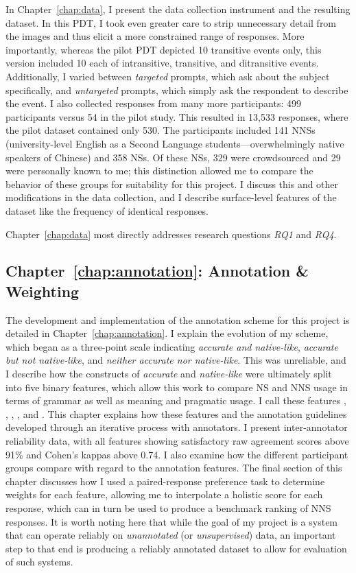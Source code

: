 In Chapter~\ref{chap:data}, I present the data collection instrument and the resulting dataset. In this PDT, I took even greater care to strip unnecessary detail from the images and thus elicit a more constrained range of responses. More importantly, whereas the pilot PDT depicted 10 transitive events only, this version included 10 each of intransitive, transitive, and ditransitive events. Additionally, I varied between \textit{targeted} prompts, which ask about the subject specifically, and \textit{untargeted} prompts, which simply ask the respondent to describe the event. I also collected responses from many more participants: 499 participants versus 54 in the pilot study. This resulted in 13,533 responses, where the pilot dataset contained only 530. The participants included 141 NNSs (university-level English as a Second Language students---overwhelmingly native speakers of Chinese) and 358 NSs. Of these NSs, 329 were crowdsourced and 29 were personally known to me; this distinction allowed me to compare the behavior of these groups for suitability for this project. I discuss this and other modifications in the data collection, and I describe surface-level features of the dataset like the frequency of identical responses.

Chapter~\ref{chap:data} most directly addresses research questions \textit{RQ1} and \textit{RQ4}.

\subsection{Chapter~\ref{chap:annotation}: Annotation \& Weighting}

The development and implementation of the annotation scheme for this project is detailed in Chapter~\ref{chap:annotation}. I explain the evolution of my scheme, which began as a three-point scale indicating \textit{accurate and native-like}, \textit{accurate but not native-like}, and \textit{neither accurate nor native-like}. This was unreliable, and I describe how the constructs of \textit{accurate} and \textit{native-like} were ultimately split into five binary features, which allow this work to compare NS and NNS usage in terms of grammar as well as meaning and pragmatic usage. I call these features , , , , and . This chapter explains how these features and the annotation guidelines developed through an iterative process with annotators. I present inter-annotator reliability data, with all features showing satisfactory raw agreement scores above 91\% and Cohen's kappas above 0.74. I also examine how the different participant groups compare with regard to the annotation features. The final section of this chapter discusses how I used a paired-response preference task to determine weights for each feature, allowing me to interpolate a holistic score for each response, which can in turn be used to produce a benchmark ranking of NNS responses. It is worth noting here that while the goal of my project is a system that can operate reliably on \textit{unannotated} (or \textit{unsupervised}) data, an important step to that end is producing a reliably annotated dataset to allow for evaluation of such systems.

